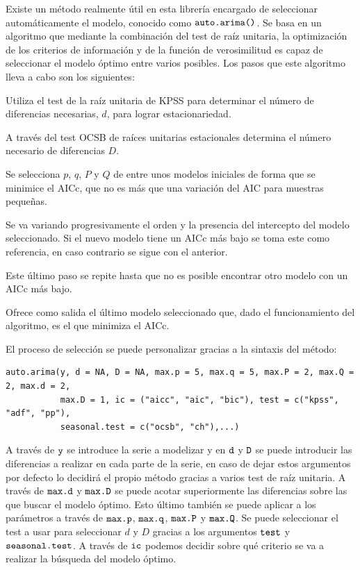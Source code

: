 Existe un método realmente útil en esta librería encargado de seleccionar automáticamente el modelo, conocido como $\verb!auto.arima()!$. Se basa en un algoritmo que mediante la combinación del test de raíz unitaria, la optimización de los criterios de información y de la función de verosimilitud es capaz de seleccionar el modelo óptimo entre varios posibles. Los pasos que este algoritmo lleva a cabo son los siguientes:
\begin{enumerate*}
  \item Utiliza el test de la raíz unitaria de KPSS para determinar el número de diferencias necesarias, $d$, para lograr estacionariedad.
  \item A través del test OCSB de raíces unitarias estacionales determina el número necesario de diferencias $D$.
  \item Se selecciona $p$, $q$, $P$ y $Q$ de entre unos modelos iniciales de forma que se minimice el AICc, que no es más que una variación del AIC para muestras pequeñas.
  \item Se va variando progresivamente el orden y la presencia del intercepto del modelo seleccionado. Si el nuevo modelo tiene un AICc más bajo se toma este como referencia, en caso contrario se sigue con el anterior.
  \item Este último paso se repite hasta que no es posible encontrar otro modelo con un AICc más bajo.
  \item Ofrece como salida el último modelo seleccionado que, dado el funcionamiento del algoritmo, es el que minimiza el AICc.
\end{enumerate*}
\newpage
El proceso de selección se puede personalizar gracias a la sintaxis del método:
\begin{Verbatim}[fontsize=\footnotesize]
auto.arima(y, d = NA, D = NA, max.p = 5, max.q = 5, max.P = 2, max.Q = 2, max.d = 2,
           max.D = 1, ic = ("aicc", "aic", "bic"), test = c("kpss", "adf", "pp"),
           seasonal.test = c("ocsb", "ch"),...)
\end{Verbatim}

A través de $\verb!y!$ se introduce la serie a modelizar y en $\verb!d!$ y $\verb!D!$ se puede introducir las diferencias a realizar en cada parte de la serie, en caso de dejar estos argumentos por defecto lo decidirá el propio método gracias a varios test de raíz unitaria. A través de $\verb!max.d!$ y $\verb!max.D!$ se puede acotar superiormente las diferencias sobre las que buscar el modelo óptimo. Esto último también se puede aplicar a los parámetros a través de $\verb!max.p!$, $\verb!max.q!$, $\verb!max.P!$ y $\verb!max.Q!$. Se puede seleccionar el test a usar para seleccionar $d$ y $D$ gracias a los argumentos $\verb!test!$ y $\verb!seasonal.test!$. A través de $\verb!ic!$ podemos decidir sobre qué criterio se va a realizar la búsqueda del modelo óptimo.

